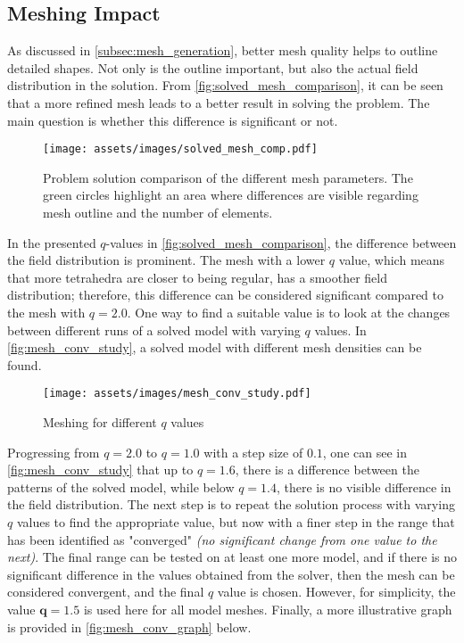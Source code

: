 \subsection{Meshing Impact}
\label{sec:mesh_quality}

As discussed in \ref{subsec:mesh_generation}, better mesh quality helps to outline detailed shapes. Not only is the outline important, but also the actual field distribution in the solution. From \autoref{fig:solved_mesh_comparison}, it can be seen that a more refined mesh leads to a better result in solving the problem. The main question is whether this difference is significant or not.

\begin{figure}[H]
    \centering
    \texttt{[image: assets/images/solved\_mesh\_comp.pdf]}
    \caption[Problem solution comparison for the different $q$ mesh parameters.]{Problem solution comparison of the different mesh parameters. The green circles highlight an area where differences are visible regarding mesh outline and the number of elements.}
    \label{fig:solved_mesh_comparison}
\end{figure}

In the presented $q$-values in \autoref{fig:solved_mesh_comparison}, the difference between the field distribution is prominent. The mesh with a lower $q$ value, which means that more tetrahedra are closer to being regular, has a smoother field distribution; therefore, this difference can be considered significant compared to the mesh with $q=2.0$. One way to find a suitable value is to look at the changes between different runs of a solved model with varying $q$ values. In \autoref{fig:mesh_conv_study}, a solved model with different mesh densities can be found.

\begin{figure}[H]
    \centering
    \texttt{[image: assets/images/mesh\_conv\_study.pdf]}
    \caption{Meshing for different $q$ values}
    \label{fig:mesh_conv_study}
\end{figure}

Progressing from $q=2.0$ to $q=1.0$ with a step size of $0.1$, one can see in \autoref{fig:mesh_conv_study} that up to $q=1.6$, there is a difference between the patterns of the solved model, while below $q=1.4$, there is no visible difference in the field distribution. The next step is to repeat the solution process with varying $q$ values to find the appropriate value, but now with a finer step in the range that has been identified as "converged" \textit{(no significant change from one value to the next)}. The final range can be tested on at least one more model, and if there is no significant difference in the values obtained from the solver, then the mesh can be considered convergent, and the final $q$ value is chosen. However, for simplicity, the value $\boldsymbol{q=1.5}$ is used here for all model meshes. Finally, a more illustrative graph is provided in \autoref{fig:mesh_conv_graph} below.

